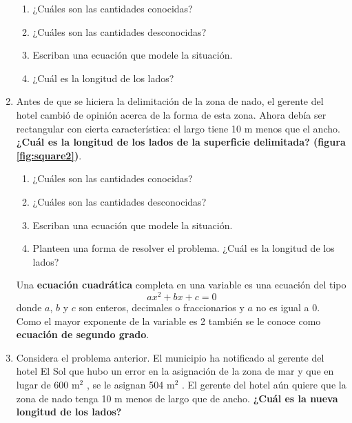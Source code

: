 \documentclass[11pt]{book}
\begin{document}
\begin{enumerate}
          \begin{enumerate}
              \item ¿Cuáles son las cantidades conocidas?
              \item ¿Cuáles son las cantidades desconocidas?
              \item Escriban una ecuación que modele la situación.
              \item ¿Cuál es la longitud de los lados?
          \end{enumerate}

    \item Antes de que se hiciera la delimitación de la zona de nado, el gerente del
          hotel cambió de opinión acerca de la forma de esta zona. Ahora debía
          ser rectangular con cierta característica: el largo tiene 10 m menos que
          el ancho. \textbf{¿Cuál es la longitud de los lados de la superficie delimitada?
              (figura \ref{fig:square2})}.\\
          \begin{enumerate}
              \item ¿Cuáles son las cantidades conocidas?
              \item ¿Cuáles son las cantidades desconocidas?
              \item Escriban una ecuación que modele la situación.
              \item Planteen una forma de resolver el problema. ¿Cuál es la longitud de los
                    lados?
          \end{enumerate}

          \begin{boxH}
              Una \textbf{ecuación cuadrática} completa en una variable es una ecuación del tipo
              \begin{equation}
                  ax^2 + bx + c = 0
              \end{equation}
              donde $a$, $b$ y $c$ son enteros, decimales o fraccionarios y $a$ no es igual a 0. Como el
              mayor exponente de la variable es 2 también se
              le conoce como \textbf{ecuación de segundo grado}.
          \end{boxH}

    \item Considera el problema anterior. El municipio ha
          notificado al gerente del hotel El Sol que hubo un error en la asignación de la zona
          de mar y que en lugar de 600 m$^2$ , se le asignan 504 m$^2$ . El gerente del hotel aún
          quiere que la zona de nado tenga 10 m menos de largo que de ancho. \textbf{¿Cuál es la
              nueva longitud de los lados?}


\end{enumerate}
\end{document}
